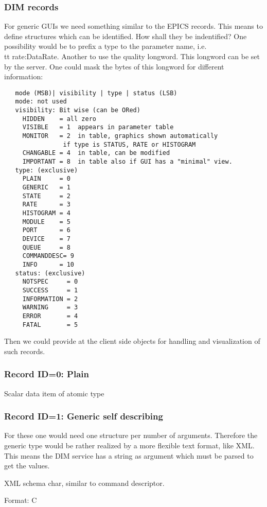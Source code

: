 \subsubsection{DIM records}
For generic GUIs we need something similar to the EPICS records. This means to define structures which can be identified. How shall they be indentified? One possibility would be to prefix a type to the parameter name, i.e. {\\tt rate:DataRate}. Another to use the quality longword. This longword can be set by the server. One could mask the bytes of this longword for different information:
\begin{verbatim}
   mode (MSB)| visibility | type | status (LSB)
   mode: not used
   visibility: Bit wise (can be ORed)
     HIDDEN    = all zero
     VISIBLE   = 1  appears in parameter table
     MONITOR   = 2  in table, graphics shown automatically 
     			if type is STATUS, RATE or HISTOGRAM
     CHANGABLE = 4  in table, can be modified
     IMPORTANT = 8  in table also if GUI has a "minimal" view.
   type: (exclusive)
     PLAIN     = 0
     GENERIC   = 1
     STATE     = 2
     RATE      = 3
     HISTOGRAM = 4
     MODULE    = 5
     PORT      = 6
     DEVICE    = 7
     QUEUE     = 8
     COMMANDDESC= 9
     INFO      = 10
   status: (exclusive) 
     NOTSPEC     = 0
     SUCCESS     = 1
     INFORMATION = 2
     WARNING     = 3
     ERROR       = 4
     FATAL       = 5
\end{verbatim}

Then we could provide at the client side objects for handling and visualization of such records.

\subsubsection{Record ID=0: Plain}

Scalar data item of atomic type

\subsubsection{Record ID=1: Generic self describing}
For these one would need one structure per number of arguments. Therefore the generic type would be rather realized by a more flexible text format, like XML. This means the DIM service has a string as argument which must be parsed to get the values.
\begin{compactdesc}
\item[XML schema] char, similar to command descriptor.
\item[Format:] C
\end{compactdesc}

